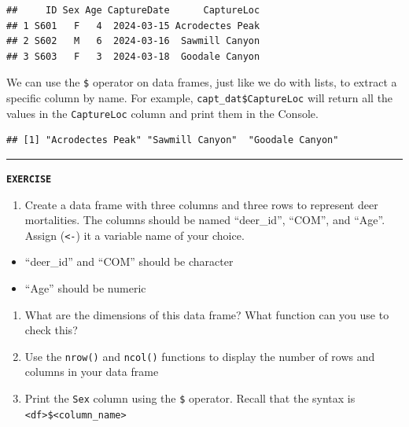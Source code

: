 \documentclass[
]{book}
\newenvironment{Shaded}{\begin{snugshade}}{\end{snugshade}}
\newcommand{\NormalTok}[1]{#1}
\newcommand{\SpecialCharTok}[1]{\textcolor[rgb]{0.81,0.36,0.00}{\textbf{#1}}}
\providecommand{\tightlist}{%
  \setlength{\itemsep}{0pt}\setlength{\parskip}{0pt}}
\begin{document}
\begin{verbatim}
##     ID Sex Age CaptureDate      CaptureLoc
## 1 S601   F   4  2024-03-15 Acrodectes Peak
## 2 S602   M   6  2024-03-16  Sawmill Canyon
## 3 S603   F   3  2024-03-18  Goodale Canyon
\end{verbatim}

We can use the \texttt{\$} operator on data frames, just like we do with lists, to extract a specific column by name. For example, \texttt{capt\_dat\$CaptureLoc} will return all the values in the \texttt{CaptureLoc} column and print them in the Console.

\begin{Shaded}
\end{Shaded}

\begin{verbatim}
## [1] "Acrodectes Peak" "Sawmill Canyon"  "Goodale Canyon"
\end{verbatim}

\begin{center}\rule{0.5\linewidth}{0.5pt}\end{center}

\textbf{\texttt{EXERCISE}}

\begin{enumerate}
\def\labelenumi{\arabic{enumi}.}
\tightlist
\item
  Create a data frame with three columns and three rows to represent deer mortalities.
  The columns should be named ``deer\_id'', ``COM'', and ``Age''. Assign (\texttt{\textless{}-}) it a variable name of your choice.
\end{enumerate}

\begin{itemize}
\tightlist
\item
  ``deer\_id'' and ``COM'' should be character
\item
  ``Age'' should be numeric
\end{itemize}

\begin{enumerate}
\def\labelenumi{\arabic{enumi}.}
\setcounter{enumi}{1}
\tightlist
\item
  What are the dimensions of this data frame? What function can you use to check this?
\item
  Use the \texttt{nrow()} and \texttt{ncol()} functions to display the number of rows and columns in your data frame
\item
  Print the \texttt{Sex} column using the \texttt{\$} operator. Recall that the syntax is \texttt{\textless{}df\textgreater{}\$\textless{}column\_name\textgreater{}}
\end{enumerate}
\end{document}
